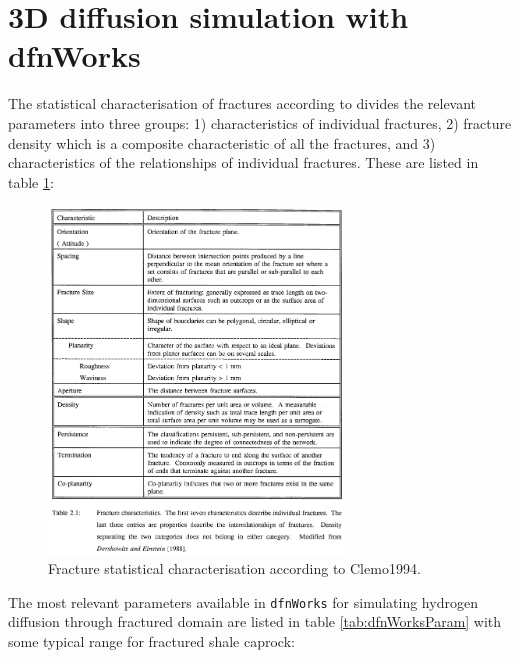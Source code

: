 \documentclass{article}
\begin{document}
\section{3D diffusion simulation with dfnWorks}
The statistical characterisation of fractures according to \cite{clemo1994dual} divides the relevant parameters into three groups: 1) characteristics of individual fractures, 2) fracture density which is a composite characteristic of all the fractures, and 3) characteristics of the relationships of individual fractures. These are listed in table \ref{fig:FracChar}:
\begin{figure}[htbp]
    \centering
    \includegraphics[width=0.7\textwidth]{images/Clemo1994FracChar.png}
    \caption{Fracture statistical characterisation according to Clemo1994.}
    \label{fig:FracChar}
\end{figure}
\FloatBarrier
The most relevant parameters available in \texttt{dfnWorks} for simulating hydrogen diffusion through fractured domain are listed in table \ref{tab:dfnWorksParam} with some typical range for fractured shale caprock:
\end{document}
